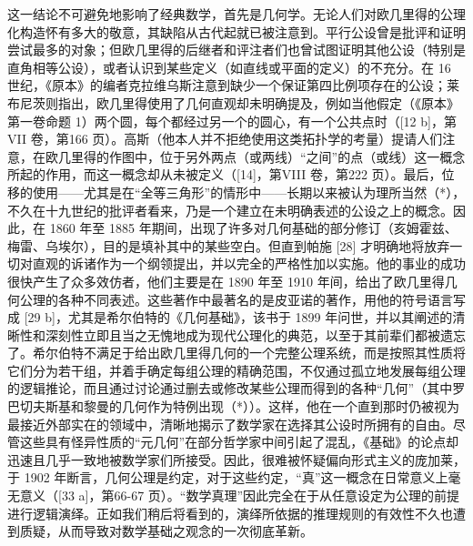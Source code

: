这一结论不可避免地影响了经典数学，首先是几何学。无论人们对欧几里得的公理化构造怀有多大的敬意，其缺陷从古代起就已被注意到。平行公设曾是批评和证明尝试最多的对象；但欧几里得的后继者和评注者们也曾试图证明其他公设（特别是直角相等公设），或者认识到某些定义（如直线或平面的定义）的不充分。在 16 世纪，《原本》的编者克拉维乌斯注意到缺少一个保证第四比例项存在的公设；莱布尼茨则指出，欧几里得使用了几何直观却未明确提及，例如当他假定（《原本》第一卷命题 1）两个圆，每个都经过另一个的圆心，有一个公共点时（{[}12 b{]}，第VII 卷，第166 页）。高斯（他本人并不拒绝使用这类拓扑学的考量）提请人们注意，在欧几里得的作图中，位于另外两点（或两线）“之间”的点（或线）这一概念所起的作用，而这一概念却从未被定义（{[}14{]}，第VIII 卷，第222 页）。最后，位移的使用——尤其是在“全等三角形”的情形中——长期以来被认为理所当然（*），不久在十九世纪的批评者看来，乃是一个建立在未明确表述的公设之上的概念。因此，在 1860 年至 1885 年期间，出现了许多对几何基础的部分修订（亥姆霍兹、梅雷、乌埃尔），目的是填补其中的某些空白。但直到帕施 {[}28{]} 才明确地将放弃一切对直观的诉诸作为一个纲领提出，并以完全的严格性加以实施。他的事业的成功很快产生了众多效仿者，他们主要是在 1890 年至 1910 年间，给出了欧几里得几何公理的各种不同表述。这些著作中最著名的是皮亚诺的著作，用他的符号语言写成 {[}29 b{]}，尤其是希尔伯特的《几何基础》，该书于 1899 年问世，并以其阐述的清晰性和深刻性立即且当之无愧地成为现代公理化的典范，以至于其前辈们都被遗忘了。希尔伯特不满足于给出欧几里得几何的一个完整公理系统，而是按照其性质将它们分为若干组，并着手确定每组公理的精确范围，不仅通过孤立地发展每组公理的逻辑推论，而且通过讨论通过删去或修改某些公理而得到的各种“几何”（其中罗巴切夫斯基和黎曼的几何作为特例出现（*））。这样，他在一个直到那时仍被视为最接近外部实在的领域中，清晰地揭示了数学家在选择其公设时所拥有的自由。尽管这些具有怪异性质的“元几何”在部分哲学家中间引起了混乱，《基础》的论点却迅速且几乎一致地被数学家们所接受。因此，很难被怀疑偏向形式主义的庞加莱，于 1902 年断言，几何公理是约定，对于这些约定，“真”这一概念在日常意义上毫无意义（{[}33 a{]}，第66-67 页）。“数学真理”因此完全在于从任意设定为公理的前提进行逻辑演绎。正如我们稍后将看到的，演绎所依据的推理规则的有效性不久也遭到质疑，从而导致对数学基础之观念的一次彻底革新。

